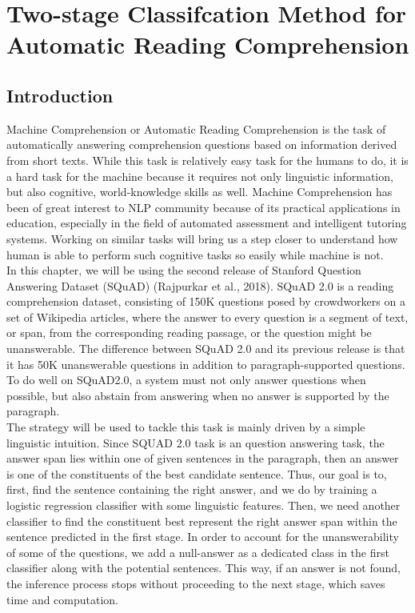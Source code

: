 
\chapter{Two-stage Classifcation Method for Automatic Reading Comprehension } %

\label{Chapter3} %

\section{Introduction}

Machine Comprehension or Automatic Reading Comprehension is the task of automatically answering comprehension questions based on information derived from short texts. While this task is relatively easy task for the humans to do, it is a hard task for the machine because it requires not only linguistic information, but also cognitive, world-knowledge skills as well. Machine Comprehension has been of great interest to NLP community because of its practical applications in education, especially in the field of automated assessment and intelligent tutoring systems. Working on similar tasks will bring us a step closer to understand how human is able to perform such cognitive tasks so easily while machine is not. \\

In this chapter, we will be using the second release of Stanford Question Answering Dataset (SQuAD) (Rajpurkar et al., 2018). SQuAD 2.0 is a reading comprehension dataset, consisting of 150K questions posed by crowdworkers on a set of Wikipedia articles, where the answer to every question is a segment of text, or span, from the corresponding reading passage, or the question might be unanswerable. The difference between SQuAD 2.0 and its previous release is that it has 50K unanswerable questions in addition to paragraph-supported questions.  To do well on SQuAD2.0, a system must not only answer questions when possible, but also abstain from answering when no answer is supported by the paragraph. \\

The strategy will be used to tackle this task is mainly driven by a simple linguistic intuition. Since SQUAD 2.0 task is an  question answering task, the answer span lies within one of given sentences in the paragraph, then an answer is one of the constituents of the best candidate sentence. Thus, our goal is to, first, find the sentence containing the right answer, and we do by training a logistic regression classifier with some linguistic features. Then, we need another classifier to find the constituent best represent the right answer span within the sentence predicted in the first stage. In order to account for the unanswerability of some of the questions, we add a null-answer as a dedicated class in the first classifier along with the potential sentences. This way, if an answer is not found, the inference process stops without proceeding to the next stage, which saves time and computation. 



